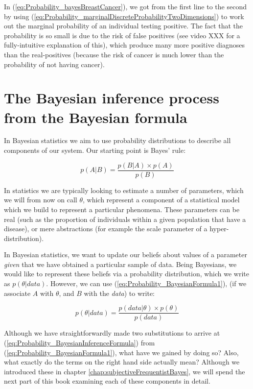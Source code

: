 \documentclass[11pt,fullpage]{book}
\begin{document}
In (\ref{eq:Probability_bayesBreastCancer}), we got from the first line to the second by using (\ref{eq:Probability_marginalDiscreteProbabilityTwoDimensions}) to work out the marginal probability of an individual testing positive. The fact that the probability is so small is due to the risk of false positives (see video XXX for a fully-intuitive explanation of this), which produce many more positive diagnoses than the real-positives (because the risk of cancer is much lower than the probability of not having cancer).

\section{The Bayesian inference process from the Bayesian formula}
In Bayesian statistics we aim to use probability distributions to describe all components of our system. Our starting point is Bayes' rule:

\begin{equation}\label{eq:Probability_BayesianFormula1}
p(A|B) = \frac{p(B|A)\times p(A)}{p(B)}
\end{equation}

In statistics we are typically looking to estimate a number of parameters, which we will from now on call $\theta$, which represent a component of a statistical model which we build to represent a particular phenomena. These parameters can be real (such as the proportion of individuals within a given population that have a disease), or mere abstractions (for example the scale parameter of a hyper-distribution).

In Bayesian statistics, we want to update our beliefs about values of a parameter \textit{given} that we have obtained a particular sample of data. Being Bayesians, we would like to represent these beliefs via a probability distribution, which we write as $p(\theta|data)$. However, we can use (\ref{eq:Probability_BayesianFormula1}), (if we associate $A$ with $\theta$, and $B$ with the \textit{data}) to write:

\begin{equation}\label{eq:Probability_BayesianInferenceFormula}
p(\theta|data) = \frac{p(data|\theta)\times p(\theta)}{p(data)}
\end{equation}

Although we have straightforwardly made two substitutions to arrive at (\ref{eq:Probability_BayesianInferenceFormula}) from (\ref{eq:Probability_BayesianFormula1}), what have we gained by doing so? Also, what exactly do the terms on the right hand side actually mean? Although we introduced these in chapter \ref{chap:subjectiveFrequentistBayes}, we will spend the next part of this book examining each of these components in detail.
\end{document}
